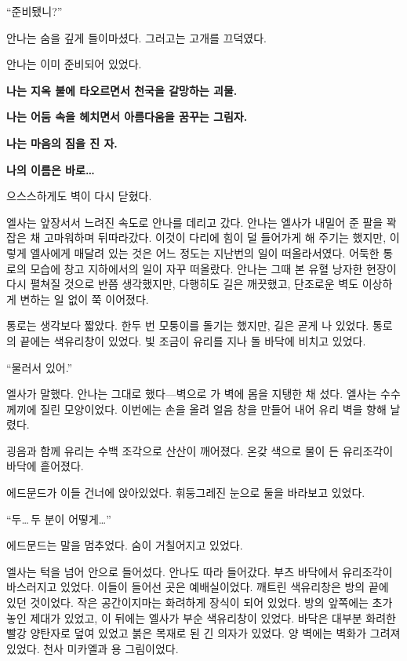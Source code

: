 ``준비됐니?''

안나는 숨을 깊게 들이마셨다. 그러고는 고개를 끄덕였다.

안나는 이미 준비되어 있었다.

\textbreak

\forceindent\textbf{나는 지옥 불에 타오르면서 천국을 갈망하는 괴물.}

\textbf{나는 어둠 속을 헤치면서 아름다움을 꿈꾸는 그림자.}

\textbf{나는 마음의 짐을 진 자.}

\textbf{나의 이름은 바로\ldots}

\textbreak

으스스하게도 벽이 다시 닫혔다.

엘사는 앞장서서 느려진 속도로 안나를 데리고 갔다. 안나는 엘사가 내밀어 준 팔을 꽉 잡은 채 고마워하며 뒤따라갔다. 이것이 다리에 힘이 덜 들어가게 해 주기는 했지만, 이렇게 엘사에게 매달려 있는 것은 어느 정도는 지난번의 일이 떠올라서였다. 어둑한 통로의 모습에 창고 지하에서의 일이 자꾸 떠올랐다. 안나는 그때 본 유혈 낭자한 현장이 다시 펼쳐질 것으로 반쯤 생각했지만, 다행히도 길은 깨끗했고, 단조로운 벽도 이상하게 변하는 일 없이 쭉 이어졌다.

통로는 생각보다 짧았다. 한두 번 모퉁이를 돌기는 했지만, 길은 곧게 나 있었다. 통로의 끝에는 색유리창이 있었다. 빛 조금이 유리를 지나 돌 바닥에 비치고 있었다.

``물러서 있어.''

엘사가 말했다. 안나는 그대로 했다—벽으로 가 벽에 몸을 지탱한 채 섰다. 엘사는 수수께끼에 질린 모양이었다. 이번에는 손을 올려 얼음 창을 만들어 내어 유리 벽을 향해 날렸다.

굉음과 함께 유리는 수백 조각으로 산산이 깨어졌다. 온갖 색으로 물이 든 유리조각이 바닥에 흩어졌다.

에드문드가 이들 건너에 앉아있었다. 휘둥그레진 눈으로 둘을 바라보고 있었다.

``두\ldots\,두 분이 어떻게\ldots''

에드문드는 말을 멈추었다. 숨이 거칠어지고 있었다.

엘사는 턱을 넘어 안으로 들어섰다. 안나도 따라 들어갔다. 부츠 바닥에서 유리조각이 바스러지고 있었다. 이들이 들어선 곳은 예배실이었다. 깨트린 색유리창은 방의 끝에 있던 것이었다. 작은 공간이지마는 화려하게 장식이 되어 있었다. 방의 앞쪽에는 초가 놓인 제대가 있었고, 이 뒤에는 엘사가 부순 색유리창이 있었다. 바닥은 대부분 화려한 빨강 양탄자로 덮여 있었고 붉은 목재로 된 긴 의자가 있었다. 양 벽에는 벽화가 그려져 있었다. 천사 미카엘과 용 그림이었다.

